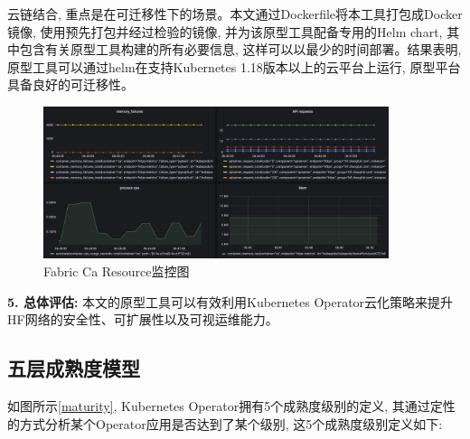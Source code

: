 云链结合, 重点是在可迁移性下的场景。本文通过Dockerfile将本工具打包成Docker镜像\footnotemark[1], 使用预先打包并经过检验的镜像, 并为该原型工具配备专用的Helm chart, 其中包含有关原型工具构建的所有必要信息, 这样可以以最少的时间部署。结果表明, 原型工具可以通过helm在支持Kubernetes 1.18版本以上的云平台上运行, 原型平台具备良好的可迁移性。

\begin{figure}[h] %
    \centering %
    \includegraphics[width=0.9\textwidth]{FIGs/chapter5/monitoring.pdf} %
    \caption{Fabric Ca Resource监控图} %
    \label{monitoring} %
\end{figure}%

\textbf{5. 总体评估: }本文的原型工具可以有效利用Kubernetes Operator云化策略来提升HF网络的安全性、可扩展性以及可视运维能力。


\subsection{五层成熟度模型}

如图所示\ref{maturity}, Kubernetes Operator拥有5个成熟度级别的定义\cite{duan2021case}, 其通过定性的方式分析某个Operator应用是否达到了某个级别, 这5个成熟度级别定义如下:

